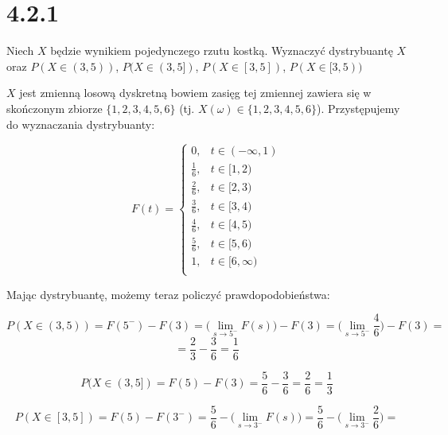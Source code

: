 \documentclass{article}
\begin{document}
\section*{4.2.1}

\begin{center}
    Niech \(X\) będzie wynikiem pojedynczego rzutu kostką. Wyznaczyć dystrybuantę \(X\) oraz
    \(P(X \in (3, 5))\), \(P(X \in (3, 5])\), \(P(X \in [3, 5])\), \(P(X \in [3, 5))\)
\end{center}

\(X\) jest zmienną losową dyskretną bowiem zasięg tej zmiennej zawiera się w skończonym 
zbiorze \(\{1, 2, 3, 4, 5, 6\}\) (tj. \(X(\omega) \in \{1, 2, 3, 4, 5, 6\}\)). Przystępujemy
do wyznaczania dystrybuanty:

\begin{equation*}
    F(t) = 
        \begin{cases}
            0,& t \in (- \infty, 1)\\
            \frac{1}{6},& t \in [1, 2)\\
            \frac{2}{6},& t \in [2, 3)\\
            \frac{3}{6},& t \in [3, 4)\\
            \frac{4}{6},& t \in [4, 5)\\
            \frac{5}{6},& t \in [5, 6)\\
            1,& t \in [6, \infty)\\ 
        \end{cases}
\end{equation*}

Mając dystrybuantę, możemy teraz policzyć prawdopodobieństwa:

\begin{equation*}
    P(X \in (3, 5)) = F(5^{-}) - F(3) = \Big(\lim_{s \to 5^{-}} F(s)\Big) - F(3) = \Big(\lim_{s \to 5^{-}} \frac{4}{6}\Big) - F(3) =
\end{equation*}
\begin{equation*}
    = \frac{2}{3} - \frac{3}{6} = \frac{1}{6}
\end{equation*}
 
\begin{equation*}
    P(X \in (3, 5]) = F(5) - F(3) = \frac{5}{6} - \frac{3}{6} = \frac{2}{6} = \frac{1}{3}
\end{equation*}

\begin{equation*}
    P(X \in [3, 5]) = F(5) - F(3^{-}) = \frac{5}{6} - \Big(\lim_{s \to 3^{-}} F(s)\Big) = \frac{5}{6} - \Big(\lim_{s \to 3^{-}} \frac{2}{6}\Big) =
\end{equation*}
\end{document}
